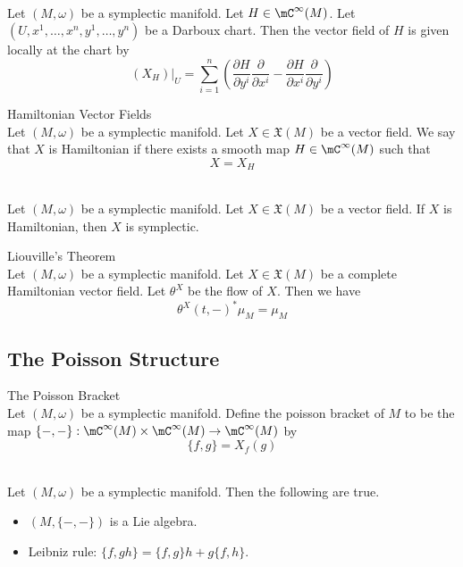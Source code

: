 \documentclass[a4paper]{article}
\begin{document}
\begin{prp}{}{}\\
Let $(M,\omega)$ be a symplectic manifold. Let $H\in\mC^\infty(M)$. Let $(U,x^1,\dots,x^n,y^1,\dots,y^n)$ be a Darboux chart. Then the vector field of $H$ is given locally at the chart by $$(X_H)|_U=\sum_{i=1}^n\left(\frac{\partial H}{\partial y^i}\frac{\partial}{\partial x^i}-\frac{\partial H}{\partial x^i}\frac{\partial}{\partial y^i}\right)$$
\end{prp}

\begin{defn}{Hamiltonian Vector Fields}{}\\
Let $(M,\omega)$ be a symplectic manifold. Let $X\in\mathfrak{X}(M)$ be a vector field. We say that $X$ is Hamiltonian if there exists a smooth map $H\in\mC^\infty(M)$ such that $$X=X_H$$
\end{defn}

\begin{prp}{}{}\\
Let $(M,\omega)$ be a symplectic manifold. Let $X\in\mathfrak{X}(M)$ be a vector field. If $X$ is Hamiltonian, then $X$ is symplectic. 
\end{prp}

\begin{thm}{Liouville's Theorem}{}\\
Let $(M,\omega)$ be a symplectic manifold. Let $X\in\mathfrak{X}(M)$ be a complete Hamiltonian vector field. Let $\theta^X$ be the flow of $X$. Then we have $$\theta^X(t,-)^\ast\mu_M=\mu_M$$
\end{thm}

\subsection{The Poisson Structure}
\begin{defn}{The Poisson Bracket}{}\\
Let $(M,\omega)$ be a symplectic manifold. Define the poisson bracket of $M$ to be the map $\{-,-\}:\mC^\infty(M)\times\mC^\infty(M)\to\mC^\infty(M)$ by $$\{f,g\}=X_f(g)$$
\end{defn}

\begin{lmm}{}{}\\
Let $(M,\omega)$ be a symplectic manifold. Then the following are true. 
\begin{itemize}
\item $(M,\{-,-\})$ is a Lie algebra. 
\item Leibniz rule: $\{f,gh\}=\{f,g\}h+g\{f,h\}$. 
\end{itemize}
\end{lmm}
\end{document}
